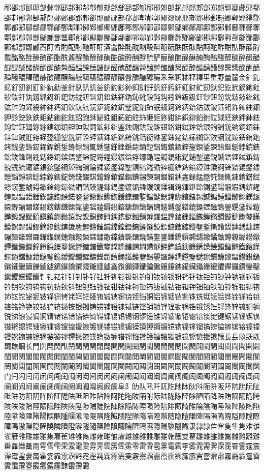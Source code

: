邴邵邶邷邸邹邺邻邼邽邾邿郀郁郂郃郄郅郆郇郈郉郊郋郌郍郎郏郐郑郒郓郔郕郖郗郘郙郚郛郜郝郞郟郠郡郢郣郤郥郦郧部郩郪郫郬郭郮郯郰郱郲郳郴郵郶郷郸郹郺郻郼都郾郿鄀鄁鄂鄃鄄鄅鄆鄇鄈鄉鄊鄋鄌鄍鄎鄏鄐鄑鄒鄓鄔鄕鄖鄗鄘鄙鄚鄛鄜鄝鄞鄟鄠鄡鄢鄣鄤鄥鄦鄧鄨鄩鄪鄫鄬鄭鄮鄯鄰鄱鄲鄳鄴鄵鄶鄷鄸鄹鄺鄻鄼鄽鄾鄿酀酁酂酃酄酅酆酇酈酉酊酋酌配酎酏酐酑酒酓酔酕酖酗酘酙酚酛酜酝酞酟酠酡酢酣酤酥酦酧酨酩酪酫酬酭酮酯酰酱酲酳酴酵酶酷酸酹酺酻酼酽酾酿醀醁醂醃醄醅醆醇醈醉醊醋醌醍醎醏醐醑醒醓醔醕醖醗醘醙醚醛醜醝醞醟醠醡醢醣醤醥醦醧醨醩醪醫醬醭醮醯醰醱醲醳醴醵醶醷醸醹醺醻醼醽醾醿釀釁釂釃釄釅釆采釈釉释釋里重野量釐金釒釓釔釕釖釗釘釙釚釛釜針釞釟釠釡釢釣釤釥釦釧釨釩釪釫釬釭釮釯釰釱釲釳釴釵釶釷釸釹釺釻釼釽釾釿鈀鈁鈂鈃鈄鈅鈆鈇鈈鈉鈊鈋鈌鈍鈎鈏鈐鈑鈒鈓鈔鈕鈖鈗鈘鈙鈚鈛鈜鈝鈞鈟鈠鈡鈢鈣鈤鈥鈦鈧鈨鈩鈪鈫鈬鈭鈮鈯鈰鈱鈲鈳鈴鈵鈶鈷鈸鈹鈺鈻鈼鈽鈾鈿鉀鉁鉂鉃鉄鉅鉆鉇鉈鉉鉊鉋鉌鉍鉎鉏鉐鉑鉒鉓鉔鉕鉖鉗鉘鉙鉚鉛鉜鉝鉞鉟鉠鉡鉢鉣鉤鉥鉦鉧鉨鉩鉪鉫鉬鉭鉮鉯鉰鉱鉲鉳鉴鉵鉶鉷鉸鉹鉺鉻鉼鉽鉾鉿銀銁銂銃銄銅銆銇銈銉銊銋銌銍銎銏銐銑銒銓銔銕銖銗銘銙銚銛銜銝銞銟銠銡銢銣銤銥銦銧銨銩銪銫銬銭銮銯銰銱銲銳銴銵銶銷銸銹銺銻銼銽銾銿鋀鋁鋂鋃鋄鋅鋆鋇鋈鋉鋊鋋鋌鋍鋎鋏鋐鋑鋒鋓鋔鋕鋖鋗鋘鋙鋚鋛鋜鋝鋞鋟鋠鋡鋢鋣鋤鋥鋦鋧鋨鋩鋪鋫鋬鋭鋮鋯鋰鋱鋲鋳鋴鋵鋶鋷鋸鋹鋺鋻鋼鋽鋾鋿錀錁錂錃錄錅錆錇錈錉錊錋錌錍錎錏錐錑錒錓錔錕錖錗錘錙錚錛錜錝錞錟錠錡錢錣錤錥錦錧錨錩錪錫錬錭錮錯錰錱録錳錴錵錶錷錸錹錺錻錼錽錾錿鍀鍁鍂鍃鍄鍅鍆鍇鍈鍉鍊鍋鍌鍍鍎鍏鍐鍑鍒鍓鍔鍕鍖鍗鍘鍙鍚鍛鍜鍝鍞鍟鍠鍡鍢鍣鍤鍥鍦鍧鍨鍩鍪鍫鍬鍭鍮鍯鍰鍱鍲鍳鍴鍵鍶鍷鍸鍹鍺鍻鍼鍽鍾鍿鎀鎁鎂鎃鎄鎅鎆鎇鎈鎉鎊鎋鎌鎍鎎鎏鎐鎑鎒鎓鎔鎕鎖鎗鎘鎙鎚鎛鎜鎝鎞鎟鎠鎡鎢鎣鎤鎥鎦鎧鎨鎩鎪鎫鎬鎭鎮鎯鎰鎱鎲鎳鎴鎵鎶鎷鎸鎹鎺鎻鎼鎽鎾鎿鏀鏁鏂鏃鏄鏅鏆鏇鏈鏉鏊鏋鏌鏍鏎鏏鏐鏑鏒鏓鏔鏕鏖鏗鏘鏙鏚鏛鏜鏝鏞鏟鏠鏡鏢鏣鏤鏥鏦鏧鏨鏩鏪鏫鏬鏭鏮鏯鏰鏱鏲鏳鏴鏵鏶鏷鏸鏹鏺鏻鏼鏽鏾鏿鐀鐁鐂鐃鐄鐅鐆鐇鐈鐉鐊鐋鐌鐍鐎鐏鐐鐑鐒鐓鐔鐕鐖鐗鐘鐙鐚鐛鐜鐝鐞鐟鐠鐡鐢鐣鐤鐥鐦鐧鐨鐩鐪鐫鐬鐭鐮鐯鐰鐱鐲鐳鐴鐵鐶鐷鐸鐹鐺鐻鐼鐽鐾鐿鑀鑁鑂鑃鑄鑅鑆鑇鑈鑉鑊鑋鑌鑍鑎鑏鑐鑑鑒鑓鑔鑕鑖鑗鑘鑙鑚鑛鑜鑝鑞鑟鑠鑡鑢鑣鑤鑥鑦鑧鑨鑩鑪鑫鑬鑭鑮鑯鑰鑱鑲鑳鑴鑵鑶鑷鑸鑹鑺鑻鑼鑽鑾鑿钀钁钂钃钄钅钆钇针钉钊钋钌钍钎钏钐钑钒钓钔钕钖钗钘钙钚钛钜钝钞钟钠钡钢钣钤钥钦钧钨钩钪钫钬钭钮钯钰钱钲钳钴钵钶钷钸钹钺钻钼钽钾钿铀铁铂铃铄铅铆铇铈铉铊铋铌铍铎铏铐铑铒铓铔铕铖铗铘铙铚铛铜铝铞铟铠铡铢铣铤铥铦铧铨铩铪铫铬铭铮铯铰铱铲铳铴铵银铷铸铹铺铻铼铽链铿销锁锂锃锄锅锆锇锈锉锊锋锌锍锎锏锐锑锒锓锔锕锖锗锘错锚锛锜锝锞锟锠锡锢锣锤锥锦锧锨锩锪锫锬锭键锯锰锱锲锳锴锵锶锷锸锹锺锻锼锽锾锿镀镁镂镃镄镅镆镇镈镉镊镋镌镍镎镏镐镑镒镓镔镕镖镗镘镙镚镛镜镝镞镟镠镡镢镣镤镥镦镧镨镩镪镫镬镭镮镯镰镱镲镳镴镵镶長镸镹镺镻镼镽镾长門閁閂閃閄閅閆閇閈閉閊開閌閍閎閏閐閑閒間閔閕閖閗閘閙閚閛閜閝閞閟閠閡関閣閤閥閦閧閨閩閪閫閬閭閮閯閰閱閲閳閴閵閶閷閸閹閺閻閼閽閾閿闀闁闂闃闄闅闆闇闈闉闊闋闌闍闎闏闐闑闒闓闔闕闖闗闘闙闚闛關闝闞闟闠闡闢闣闤闥闦闧门闩闪闫闬闭问闯闰闱闲闳间闵闶闷闸闹闺闻闼闽闾闿阀阁阂阃阄阅阆阇阈阉阊阋阌阍阎阏阐阑阒阓阔阕阖阗阘阙阚阛阜阝阞队阠阡阢阣阤阥阦阧阨阩阪阫阬阭阮阯阰阱防阳阴阵阶阷阸阹阺阻阼阽阾阿陀陁陂陃附际陆陇陈陉陊陋陌降陎陏限陑陒陓陔陕陖陗陘陙陚陛陜陝陞陟陠陡院陣除陥陦陧陨险陪陫陬陭陮陯陰陱陲陳陴陵陶陷陸陹険陻陼陽陾陿隀隁隂隃隄隅隆隇隈隉隊隋隌隍階随隐隑隒隓隔隕隖隗隘隙隚際障隝隞隟隠隡隢隣隤隥隦隧隨隩險隫隬隭隮隯隰隱隲隳隴隵隶隷隸隹隺隻隼隽难隿雀雁雂雃雄雅集雇雈雉雊雋雌雍雎雏雐雑雒雓雔雕雖雗雘雙雚雛雜雝雞雟雠雡離難雤雥雦雧雨雩雪雫雬雭雮雯雰雱雲雳雴雵零雷雸雹雺電雼雽雾雿需霁霂霃霄霅霆震霈霉霊霋霌霍霎霏霐霑霒霓霔霕霖霗霘霙霚霛霜霝霞霟霠霡霢霣霤霥霦霧霨霩霪霫霬霭霮霯霰霱露霳霴霵霶霷